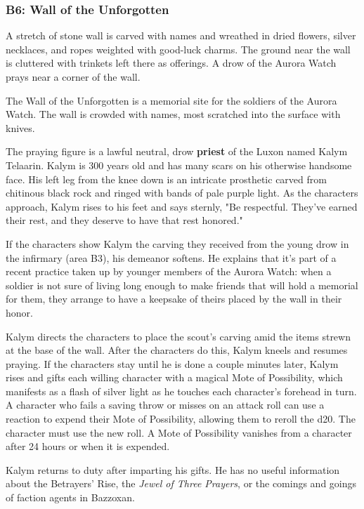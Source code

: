 \documentclass[letterpaper, 11pt, bg=full, twocolumn]{dndbook}
\begin{document}
\subsubsection{B6: Wall of the Unforgotten}

\begin{DndReadAloud}
A stretch of stone wall is carved with names and wreathed in dried flowers, silver necklaces, and ropes weighted with good-luck charms. The ground near the wall is cluttered with trinkets left there as offerings. A drow of the Aurora Watch prays near a corner of the wall.
\end{DndReadAloud}

The Wall of the Unforgotten is a memorial site for the soldiers of the Aurora Watch. The wall is crowded with names, most scratched into the surface with knives.

The praying figure is a lawful neutral, drow \textbf{priest} of the Luxon named Kalym Telaarin. Kalym is 300 years old and has many scars on his otherwise handsome face. His left leg from the knee down is an intricate prosthetic carved from chitinous black rock and ringed with bands of pale purple light. As the characters approach, Kalym rises to his feet and says sternly, "Be respectful. They've earned their rest, and they deserve to have that rest honored."

If the characters show Kalym the carving they received from the young drow in the infirmary (area B3), his demeanor softens. He explains that it's part of a recent practice taken up by younger members of the Aurora Watch: when a soldier is not sure of living long enough to make friends that will hold a memorial for them, they arrange to have a keepsake of theirs placed by the wall in their honor.

Kalym directs the characters to place the scout's carving amid the items strewn at the base of the wall. After the characters do this, Kalym kneels and resumes praying. If the characters stay until he is done a couple minutes later, Kalym rises and gifts each willing character with a magical Mote of Possibility, which manifests as a flash of silver light as he touches each character's forehead in turn. A character who fails a saving throw or misses on an attack roll can use a reaction to expend their Mote of Possibility, allowing them to reroll the d20. The character must use the new roll. A Mote of Possibility vanishes from a character after 24 hours or when it is expended.

Kalym returns to duty after imparting his gifts. He has no useful information about the Betrayers' Rise, the \textit{Jewel of Three Prayers}, or the comings and goings of faction agents in Bazzoxan.
\end{document}
